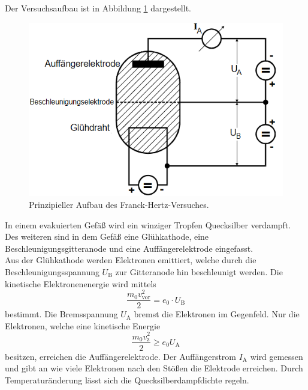 Der Versuchsaufbau ist in Abbildung \ref{fig:auft} dargestellt.
\begin{figure}
    \centering
    \caption{Prinzipieller Aufbau des Franck-Hertz-Versuches.\cite{v601}}
    \label{fig:auft}
    \includegraphics[width = 0.6 \textwidth]{pics/auft.png}
\end{figure}
In einem evakuierten Gefäß wird ein winziger Tropfen Quecksilber verdampft. Des weiteren sind in dem Gefäß eine Glühkathode, eine Beschleunigungsgitteranode und
eine Auffängerelektrode eingefasst. 
\\
Aus der Glühkathode werden Elektronen emittiert, welche durch die Beschleunigungsspannung $U_\text{B}$ zur Gitteranode hin beschleunigt werden.
Die kinetische Elektronenenergie wird mittels
\begin{equation}
    \frac{m_0 v_\text{vor}^2}{2} = e_0 \cdot U_\text{B}
\end{equation}
bestimmt. Die Bremsspannung $U_\text{A}$ bremst die Elektronen im Gegenfeld.
Nur die Elektronen, welche eine kinetische Energie
\begin{equation}
    \frac{m_0 v_\text{z}^2}{2} \geq e_0 U_\text{A}
\end{equation}
besitzen, erreichen die Auffängerelektrode. Der Auffängerstrom $I_\text{A}$ wird gemessen und gibt an wie viele Elektronen nach den Stößen die Elektrode erreichen.
Durch Temperaturänderung lässt sich die Quecksilberdampfdichte regeln.